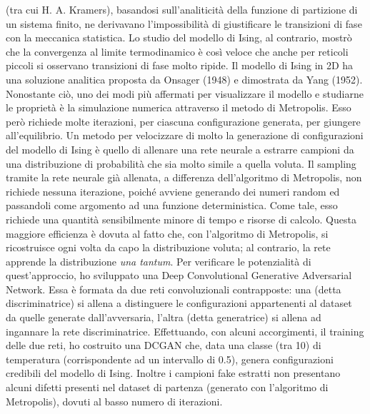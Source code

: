 \documentclass[a4paper]{article}
\begin{document}
(tra cui H. A. Kramers), basandosi sull'analiticità della funzione di partizione di un sistema finito, ne derivavano l'impossibilità di giustificare le transizioni di fase con la meccanica statistica. \cite{Kadanoff2009} Lo studio del modello di Ising, al contrario, mostrò che la convergenza al limite termodinamico è così veloce che anche per reticoli piccoli si osservano transizioni di fase molto ripide.
Il modello di Ising in 2D ha una soluzione analitica proposta da Onsager (1948) e dimostrata da Yang (1952). Nonostante ciò, uno dei modi più affermati per visualizzare il modello e studiarne le proprietà è la simulazione numerica attraverso il metodo di Metropolis. Esso però richiede molte iterazioni, per ciascuna configurazione generata, per giungere all'equilibrio.
Un metodo per velocizzare di molto la generazione di configurazioni del modello di Ising è quello di allenare una rete neurale a estrarre campioni da una distribuzione di probabilità che sia molto simile a quella voluta. Il sampling tramite la rete neurale già allenata, a differenza dell'algoritmo di Metropolis, non richiede nessuna iterazione, poiché avviene generando dei numeri random ed passandoli come argomento ad una funzione deterministica. Come tale, esso richiede una quantità sensibilmente minore di tempo e risorse di calcolo. Questa maggiore efficienza è dovuta al fatto che, con l'algoritmo di Metropolis, si ricostruisce ogni volta da capo la distribuzione voluta; al contrario, la rete apprende la distribuzione \textit{una tantum}. Per verificare le potenzialità di quest'approccio, ho sviluppato una  Deep Convolutional Generative Adversarial Network. Essa è formata da due reti convoluzionali contrapposte: una (detta discriminatrice) si allena a distinguere le configurazioni appartenenti al dataset da quelle generate dall'avversaria, l'altra (detta generatrice) si allena ad ingannare la rete discriminatrice. Effettuando, con alcuni accorgimenti, il training delle due reti, ho costruito una DCGAN che, data una classe (tra 10) di temperatura (corrispondente ad un intervallo di 0.5), genera configurazioni credibili del modello di Ising. Inoltre i campioni fake estratti non presentano alcuni difetti presenti nel dataset di partenza (generato con l'algoritmo di Metropolis), dovuti al basso numero di iterazioni.
\end{document}
